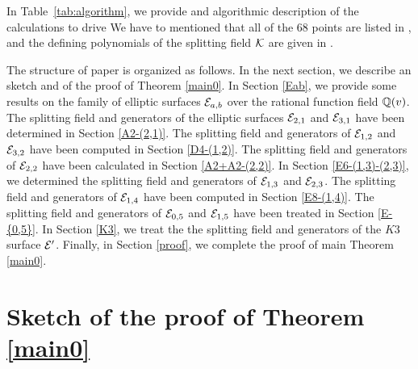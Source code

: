 \documentclass[11pt]{amsart}
\begin{document}
In Table~\ref{tab:algorithm}, we provide and algorithmic description of the calculations to drive 
We have to mentioned that all of the 68 points are   listed in \cite[Points-68]{Shioda360-Codes}, and the defining polynomials of the splitting field ${\mathcal K}$ are given in \cite[Pol-1728, Pol-11520]{Shioda360-Codes}.

The structure  of   paper is organized as follows. In the next section, we describe an   sketch and  of the proof  of Theorem \ref{main0}.
In Section \ref{Eab},  we provide some results on the family of elliptic surfaces ${\mathcal E}_{a,b}$ over the rational function field ${\mathbb Q}(v)$.
The splitting field and generators of the elliptic surfaces ${\mathcal E}_{2,1}$ and ${\mathcal E}_{3,1}$ have been determined in Section
\ref{A2-(2,1)}.  The splitting field and generators of  ${\mathcal E}_{1,2}$ and ${\mathcal E}_{3,2}$   have been computed in Section
\ref{D4-(1,2)}.  The splitting field and generators of ${\mathcal E}_{2,2}$ have been calculated in Section
\ref{A2+A2-(2,2)}. In Section \ref{E6-(1,3)-(2,3)}, we determined  the splitting field and generators of ${\mathcal E}_{1, 3}$  and ${\mathcal E}_{2, 3}$.
 The splitting field and generators of ${\mathcal E}_{1, 4}$  have been computed in Section
\ref{E8-(1,4)}.  The  splitting field and generators of  ${\mathcal E}_{0,5}$ and ${\mathcal E}_{1,5}$ have been treated in Section
\ref{E-{0,5}}. In Section \ref{K3}, we treat the the  splitting field and generators of the  $K3$ surface ${\mathcal E}'$.
 Finally, in Section \ref{proof}, we complete the proof of  main Theorem \ref{main0}.

\section{Sketch of the proof of  Theorem \ref{main0}}
\end{document}
